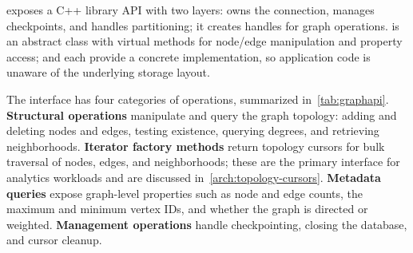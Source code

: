 \project{} exposes a C++ library API with two layers:  owns the \wt{} connection, manages checkpoints, and handles partitioning; it creates  handles for graph operations.
 is an abstract class with virtual methods for node/edge manipulation and property access;  and  each provide a concrete implementation, so application code is unaware of the underlying storage layout.

The  interface has four categories of operations, summarized in~\autoref{tab:graphapi}.
\textbf{Structural operations} manipulate and query the graph topology: adding and deleting nodes and edges, testing existence, querying degrees, and retrieving neighborhoods.
\textbf{Iterator factory methods} return topology cursors for bulk traversal of nodes, edges, and neighborhoods; these are the primary interface for analytics workloads and are discussed in~\autoref{arch:topology-cursors}.
\textbf{Metadata queries} expose graph-level properties such as node and edge counts, the maximum and minimum vertex IDs, and whether the graph is directed or weighted.
\textbf{Management operations} handle checkpointing, closing the database, and cursor cleanup.

